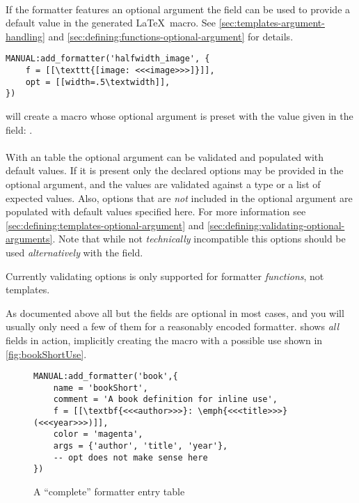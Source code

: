 \documentclass[12pt]{scrartcl}
\begin{document}
\paragraph{}

If the formatter features an optional argument the  field can be
used to provide a default value in the generated \LaTeX\ macro.  See
\vref{sec:templates-argument-handling} and
\vref{sec:defining:functions-optional-argument} for details.

\begin{verbatim}
MANUAL:add_formatter('halfwidth_image', {
	f = [[\texttt{[image: <<<image>>>]}]],
	opt = [[width=.5\textwidth]],
})
\end{verbatim}

\noindent will create a macro whose optional argument is preset with the value
given in the  field:
\texttt{}.


\paragraph{}

With an  table the optional argument can be validated and
populated with default values.  If it is present only the declared options may
be provided in the optional argument, and the values are validated against a
type or a list of expected values.  Also, options that are \emph{not} included
in the optional argument are populated with default values specified here. For
more information see \vref{sec:defining:templates-optional-argument} and
\vref{sec:defining:validating-optional-arguments}.  Note that while not
\emph{technically} incompatible this options should be used \emph{alternatively}
with the  field.

 Currently validating options is only supported for formatter
\emph{functions}, not templates.

\bigskip

As documented above all but the  fields are optional in most cases,
and you will usually only need a few of them for a reasonably encoded formatter.
 shows \emph{all} fields in action, implicitly creating the
macro  with a possible use shown in
\vref{fig:bookShortUse}.

\begin{figure}
\begin{verbatim}
MANUAL:add_formatter('book',{
    name = 'bookShort',
    comment = 'A book definition for inline use',
    f = [[\textbf{<<<author>>>}: \emph{<<<title>>>} (<<<year>>>)]],
    color = 'magenta',
    args = {'author', 'title', 'year'},
    -- opt does not make sense here
})
\end{verbatim}
\caption{A “complete” formatter entry table}
\label{fig:bookShort}
\end{figure}
\end{document}
